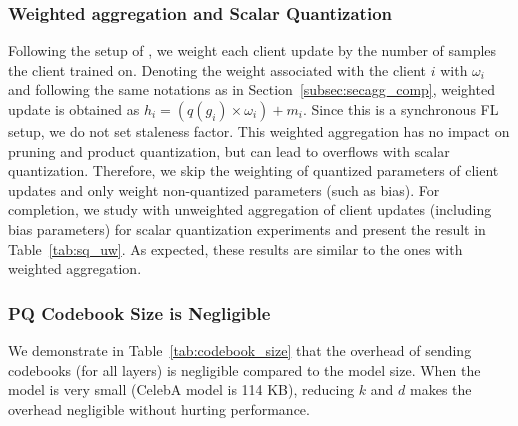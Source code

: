 \subsubsection{Weighted aggregation and Scalar Quantization}
\label{appendix:w_agg}
Following the setup of \cite{nguyen2021federated}, we weight each client update by the number of samples the client trained on. Denoting the weight associated with the client $i$ with $\omega_i$ and following the same notations as in Section~\ref{subsec:secagg_comp}, weighted update is obtained as $h_i = (q(g_i) \times \omega_i) + m_i$. Since this is a synchronous FL setup, we do not set staleness factor. This weighted aggregation has no impact on pruning and product quantization, but can lead to overflows with scalar quantization. Therefore, we skip the weighting of quantized parameters of client updates and only weight non-quantized parameters (such as bias). For completion, we study with unweighted aggregation of client updates (including bias parameters) for scalar quantization experiments and present the result in Table~\ref{tab:sq_uw}. As expected, these results are similar to the ones with weighted aggregation.

\subsubsection{PQ Codebook Size is Negligible}
\label{appendix:codebook_size}

We demonstrate in Table~\ref{tab:codebook_size} that the overhead of sending codebooks (for all layers) is negligible compared to the model size. When the model is very small (CelebA model is 114 KB), reducing $k$ and $d$ makes the overhead negligible without hurting performance.

